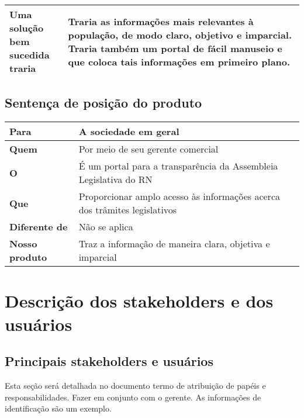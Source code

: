 \documentclass[12pt, a4paper]{article}
\begin{document}
\begin{tabu}{X[1] | X[3]}
                \textbf{Uma solução bem \newline sucedida traria} &
                Traria as informações mais relevantes à população, de modo
                claro, objetivo e imparcial. Traria também um portal de fácil
                manuseio e que coloca tais informações em primeiro plano.
                \\ \hline

            \end{tabu}

        \subsection{Sentença de posição do produto}
            \begin{tabu}{X[1] | X[3]}
                \hline
                \textbf{Para} &
                A sociedade em geral
                \\ \hline
                \textbf{Quem} &
                Por meio de seu gerente comercial
                \\ \hline
                \textbf{O} &
                É um portal para a transparência da Assembleia Legislativa do RN
                \\ \hline
                \textbf{Que} &
                Proporcionar amplo acesso às informações acerca dos trâmites
                legislativos
                \\ \hline
                \textbf{Diferente de} &
                Não se aplica
                \\ \hline
                \textbf{Nosso produto} &
                Traz a informação de maneira clara, objetiva e imparcial
                \\ \hline
            \end{tabu}

    \section{Descrição dos stakeholders e dos usuários}
        \subsection{Principais stakeholders e usuários}
            {\color{red} Esta seção será detalhada no documento termo de
            atribuição de papéis e responsabilidades. Fazer em conjunto com o
            gerente. As informações de identificação são um exemplo.}
\end{document}
